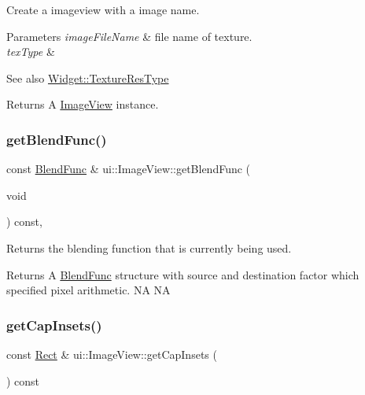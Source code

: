 Create a imageview with a image name.


\begin{DoxyParams}{Parameters}
{\em image\+File\+Name} & file name of texture. \\
\hline
{\em tex\+Type} & \\
\hline
\end{DoxyParams}
\begin{DoxySeeAlso}{See also}
{\ttfamily \hyperlink{classui_1_1Widget_a040a65ec5ad3b11119b7e16b98bd9af0}{Widget\+::\+Texture\+Res\+Type}} 
\end{DoxySeeAlso}
\begin{DoxyReturn}{Returns}
A \hyperlink{classui_1_1ImageView}{Image\+View} instance. 
\end{DoxyReturn}
\mbox{\label{classui_1_1ImageView_a0216c8cc372c22f705d7da03ef842ad8}} 
\subsubsection{\texorpdfstring{get\+Blend\+Func()}{getBlendFunc()}}
{\footnotesize\ttfamily const \hyperlink{structBlendFunc}{Blend\+Func} \& ui\+::\+Image\+View\+::get\+Blend\+Func (\begin{DoxyParamCaption}\item[{void}]{ }\end{DoxyParamCaption}) const\hspace{0.3cm}{\ttfamily [override]}, {\ttfamily [virtual]}}

Returns the blending function that is currently being used.

\begin{DoxyReturn}{Returns}
A \hyperlink{structBlendFunc}{Blend\+Func} structure with source and destination factor which specified pixel arithmetic.  NA  NA 
\end{DoxyReturn}
\mbox{\label{classui_1_1ImageView_a9e86562ac6bad878494605b324dced2f}} 
\subsubsection{\texorpdfstring{get\+Cap\+Insets()}{getCapInsets()}\hspace{0.1cm}{\footnotesize\ttfamily [1/2]}}
{\footnotesize\ttfamily const \hyperlink{classRect}{Rect} \& ui\+::\+Image\+View\+::get\+Cap\+Insets (\begin{DoxyParamCaption}{ }\end{DoxyParamCaption}) const}

